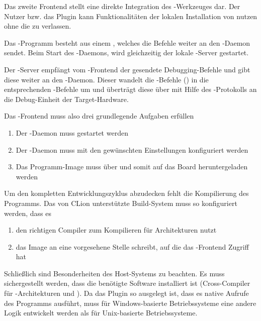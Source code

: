         Das zweite Frontend stellt eine direkte Integration des -Werkzeuges dar. Der Nutzer bzw. das Plugin
        kann Funktionalitäten der lokalen Installation von  nutzen ohne die  zu verlassen.

        Das -Programm besteht aus einem , welches die Befehle weiter an den -Daemon
        sendet. Beim Start des -Daemons, wird gleichzeitig der lokale -Server gestartet.

        Der -Server empfängt vom \hyp{}Frontend der  gesendete Debugging\hyp{}Befehle und gibt diese weiter an den
        \hyp{}Daemon. Dieser wandelt die -Befehle () in die entsprechenden -Befehle um und überträgt
        diese über  mit Hilfe des -Protokolls an die Debug-Einheit der Target\hyp{}Hardware.

        Das -Frontend muss also drei grundlegende Aufgaben erfüllen
        \begin{enumerate}
            \item Der -Daemon muss gestartet werden
            \item Der -Daemon muss mit den gewünschten Einstellungen konfiguriert werden
            \item Das Programm-Image muss über  und somit  auf das Board heruntergeladen werden
        \end{enumerate}

        Um den kompletten Entwicklungszyklus abzudecken fehlt die Kompilierung des Programms. Das von CLion
        unterstützte Build-System  muss so konfiguriert werden, dass es
        \begin{enumerate}
            \item den richtigen Compiler zum Kompilieren für  Architekturen nutzt
            \item das Image an eine vorgesehene Stelle schreibt, auf die das -Frontend Zugriff hat
        \end{enumerate}

        Schließlich sind Besonderheiten des Host-Systems zu beachten. Es muss sichergestellt werden, dass die
        benötigte Software installiert ist (Cross-Compiler für -Architekturen und ).
        Da das Plugin so ausgelegt ist, dass es native Aufrufe des  Programms ausführt, muss für
        Windows-basierte Betriebssysteme eine andere Logik entwickelt werden als für Unix-basierte Betriebssysteme.

